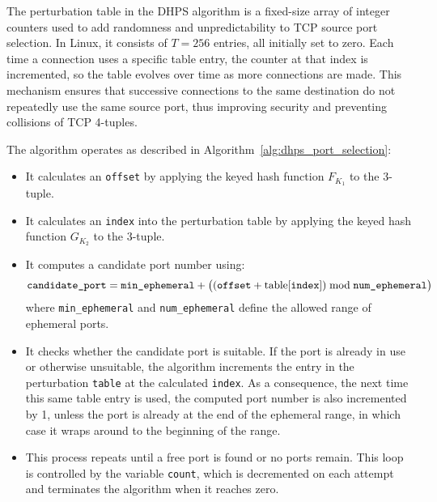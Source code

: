 \documentclass{report}
\begin{document}
The \alert{perturbation table} in the DHPS algorithm is a fixed-size array of integer counters used to add randomness and unpredictability to TCP source port selection. In Linux, it consists of $T = 256$ entries, all initially set to zero. Each time a connection uses a specific table entry, the counter at that index is incremented, so the table evolves over time as more connections are made. This mechanism ensures that successive connections to the same destination do not repeatedly use the same source port, thus improving security and preventing collisions of TCP 4-tuples.

The algorithm operates as described in Algorithm~\ref{alg:dhps_port_selection}:
\begin{itemize}
	\item It calculates an \texttt{offset} by applying the keyed hash function \( F_{K_1} \) to the 3-tuple.
	\item It calculates an \texttt{index} into the perturbation table by applying the keyed hash function \( G_{K_2} \) to the 3-tuple.
	\item It computes a candidate port number using:
	\[
		\texttt{candidate\_port} = \texttt{min\_ephemeral} + \bigl((\texttt{offset} + \text{table[\texttt{index}]}) \bmod \texttt{num\_ephemeral}\bigr)
	\]
	where \texttt{min\_ephemeral} and \texttt{num\_ephemeral} define the allowed range of ephemeral ports.
	\item It checks whether the candidate port is suitable. If the port is already in use or otherwise unsuitable, the algorithm increments the entry in the perturbation \texttt{table} at the calculated \texttt{index}. As a consequence, the next time this same table entry is used, the computed port number is also incremented by 1, unless the port is already at the end of the ephemeral range, in which case it wraps around to the beginning of the range.
	\item This process repeats until a free port is found or no ports remain. This loop is controlled by the variable \texttt{count}, which is decremented on each attempt and terminates the algorithm when it reaches zero.
\end{itemize}

\begin{center}
	\begin{minipage}[t]{0.5\textwidth}
		\vspace{0cm}

		
	\end{minipage}
\end{center}
\end{document}
